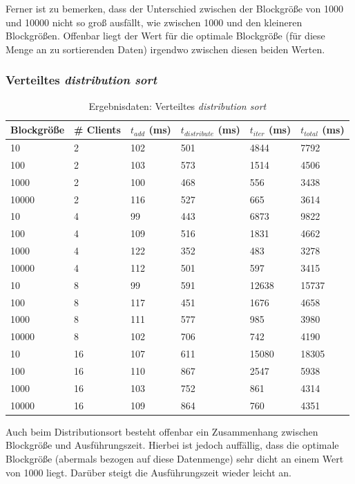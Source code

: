 \documentclass[fontsize=12pt,a4paper,headinclude=no,headings=small]{scrartcl}
\begin{document}
Ferner ist zu bemerken, dass der Unterschied zwischen der Blockgröße von 1000 und 10000 nicht so groß ausfällt, wie zwischen 1000 und den kleineren Blockgrößen. Offenbar liegt der Wert für die optimale Blockgröße (für diese Menge an zu sortierenden Daten) irgendwo zwischen diesen beiden Werten.

\subsubsection{Verteiltes \textit{distribution sort}}
\begin{table}[htp]
\begin{tabularx}{\textwidth}{ |X|X|X|X|X|X| }
\hline
Blockgröße & \# Clients & $t_{add}$ (ms) & $t_{distribute}$ (ms) & $t_{iter}$ (ms) & $t_{total}$ (ms) \\
\hline
10 & 2 & 102 & 501 & 4844 & 7792 \\
100 & 2 & 103 & 573 & 1514 & 4506 \\
1000 & 2 & 100 & 468 & 556 & 3438 \\
10000 & 2 & 116 & 527 & 665 & 3614 \\
\hline
10 & 4 & 99 & 443 & 6873 & 9822 \\ 
100 & 4 & 109 & 516 & 1831 & 4662 \\ 
1000 & 4 & 122 & 352 & 483 & 3278 \\ 
10000 & 4 & 112 & 501 & 597 & 3415 \\
\hline
10 & 8 & 99 & 591 & 12638 & 15737 \\
100 & 8 & 117 & 451 & 1676 & 4658 \\
1000 & 8 & 111 & 577 & 985 & 3980 \\
10000 & 8 & 102 & 706 & 742 & 4190 \\
\hline
10 & 16 & 107 & 611 & 15080 & 18305 \\
100 & 16 & 110 & 867 & 2547 & 5938 \\
1000 & 16 & 103 & 752 & 861 & 4314 \\
10000 & 16 & 109 & 864 & 760 & 4351 \\
\hline
\end{tabularx}
\caption{Ergebnisdaten: Verteiltes \textit{distribution sort}}
\end{table}
Auch beim Distributionsort besteht offenbar ein Zusammenhang zwischen Blockgröße und Ausführungszeit. Hierbei ist jedoch auffällig, dass die optimale Blockgröße (abermals bezogen auf diese Datenmenge) sehr dicht an einem Wert von 1000 liegt. Darüber steigt die Ausführungszeit wieder leicht an.
\end{document}
